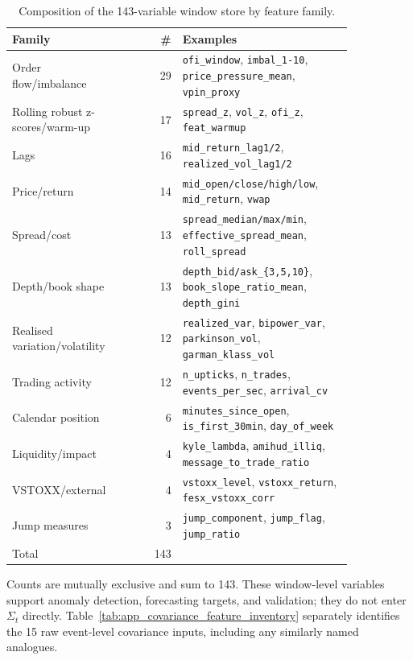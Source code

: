 
\begin{table}[!htbp]
\centering
\caption{Composition of the 143-variable window store by feature family.}
\label{tab:app_window_feature_families}
\small
\begin{tabular}{@{}p{0.34\linewidth} r p{0.50\linewidth}@{}}
\toprule
Family & \# & Examples\\
\midrule
Order flow/imbalance
& 29 & \texttt{ofi\_window}, \texttt{imbal\_1-10},
\texttt{price\_pressure\_mean}, \texttt{vpin\_proxy}\\
Rolling robust z-scores/warm-up
& 17 & \texttt{spread\_z}, \texttt{vol\_z}, \texttt{ofi\_z},
\texttt{feat\_warmup}\\
Lags
& 16 & \texttt{mid\_return\_lag1/2},
\texttt{realized\_vol\_lag1/2}\\
Price/return
& 14 & \texttt{mid\_open/close/high/low}, \texttt{mid\_return},
\texttt{vwap}\\
Spread/cost
& 13 & \texttt{spread\_median/max/min},
\texttt{effective\_spread\_mean}, \texttt{roll\_spread}\\
Depth/book shape
& 13 & \texttt{depth\_bid/ask\_\{3,5,10\}},
\texttt{book\_slope\_ratio\_mean}, \texttt{depth\_gini}\\
Realised variation/volatility
& 12 & \texttt{realized\_var}, \texttt{bipower\_var},
\texttt{parkinson\_vol}, \texttt{garman\_klass\_vol}\\
Trading activity
& 12 & \texttt{n\_upticks}, \texttt{n\_trades},
\texttt{events\_per\_sec}, \texttt{arrival\_cv}\\
Calendar position
& 6 & \texttt{minutes\_since\_open}, \texttt{is\_first\_30min},
\texttt{day\_of\_week}\\
Liquidity/impact
& 4 & \texttt{kyle\_lambda}, \texttt{amihud\_illiq},
\texttt{message\_to\_trade\_ratio}\\
VSTOXX/external
& 4 & \texttt{vstoxx\_level}, \texttt{vstoxx\_return},
\texttt{fesx\_vstoxx\_corr}\\
Jump measures
& 3 & \texttt{jump\_component}, \texttt{jump\_flag},
\texttt{jump\_ratio}\\
\midrule
Total & 143 & \\
\bottomrule
\end{tabular}
\begin{minipage}{0.94\linewidth}\footnotesize
Counts are mutually exclusive and sum to 143.
These window-level variables support anomaly detection, forecasting targets, and validation;
they do not enter \(\Sigma_t\) directly. Table~\ref{tab:app_covariance_feature_inventory}
separately identifies the 15 raw event-level covariance inputs, including any similarly named
analogues.
\end{minipage}
\end{table}
